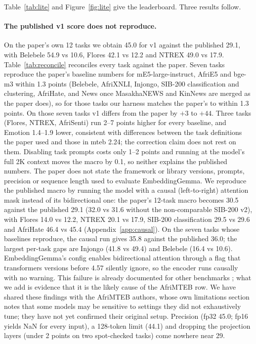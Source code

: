\documentclass[conference]{IEEEtran}
\newcommand{\eg}{EmbeddingGemma}
\begin{document}
Table~\ref{tab:lite} and Figure~\ref{fig:lite} give the leaderboard. Three
results follow.

\paragraph{The published v1 score does not reproduce.}
On the paper's own 12 tasks we obtain 45.0 for v1 against the published 29.1,
with Belebele 54.9 vs 10.6, Flores 42.1 vs 12.2 and NTREX 49.0 vs 17.9.
Table~\ref{tab:reconcile} reconciles every task against the paper. Seven tasks
reproduce the paper's baseline numbers for mE5-large-instruct, AfriE5 and
bge-m3 within 1.3 points (Belebele, AfriXNLI, Injongo, SIB-200 classification
and clustering, AfriHate, and News once MasakhaNEWS and KinNews are merged as
the paper does), so for those tasks our harness matches the paper's to within 1.3 points. On those seven tasks v1 differs from the paper by $+3$ to $+44$. Three tasks (Flores, NTREX, AfriSenti) run 2--7 points higher for every baseline, and Emotion 1.4--1.9 lower, consistent with differences between the task definitions the paper used and those in mteb 2.24; the correction claim does not rest on them. Disabling task prompts costs only 1--2 points and running at the model's full 2K context moves the macro by 0.1, so neither explains the published numbers. The paper does not state the framework or library versions, prompts, precision or sequence length used to evaluate \eg{}. We
reproduce the published macro by running the model with a causal
(left-to-right) attention mask instead of its bidirectional one: the paper's
12-task macro becomes 30.5 against the published 29.1 (32.0 vs 31.6
without the non-comparable SIB-200 v2), with Flores 14.0
vs 12.2, NTREX 20.1 vs 17.9, SIB-200 classification 29.5 vs 29.6 and
AfriHate 46.4 vs 45.4 (Appendix~\ref{app:causal}). On the seven tasks whose baselines reproduce, the causal run gives 35.8 against the published 36.0; the largest per-task gaps are Injongo (41.8 vs 49.4) and Belebele (16.4 vs 10.6). EmbeddingGemma's config
enables bidirectional attention through a flag that transformers versions before 4.57 silently ignore, so the encoder runs causally with no warning. This failure
is already documented for other benchmarks \cite{mteb2025gemmaissue,st2026causalissue};
what we add is evidence that it is the likely cause of the AfriMTEB row. We have shared these findings with the AfriMTEB authors, whose own limitations section notes that some models may be sensitive to settings they did not exhaustively tune; they have not yet confirmed their original setup. Precision
(fp32 45.0; fp16 yields NaN for every input), a 128-token limit (44.1) and dropping the projection layers (under 2 points on two spot-checked tasks) come nowhere near 29.
\end{document}
